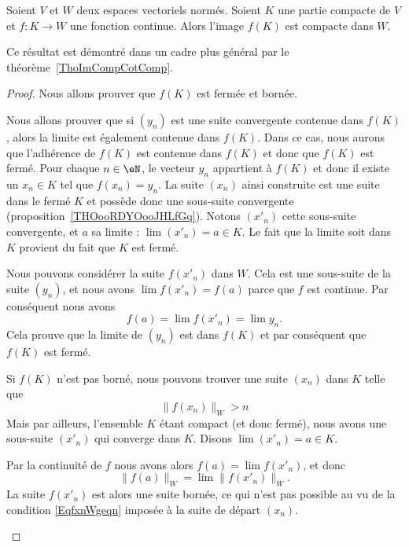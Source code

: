\begin{proposition}		\label{PropContinueCompactBorne}
	Soient \( V\) et \( W\) deux espaces vectoriels normés. Soient \( K\) une partie compacte de \( V\) et \( f\colon K\to W\) une fonction continue. Alors l'image \( f(K)\) est compacte dans \( W\).
\end{proposition}
Ce résultat est démontré dans un cadre plus général par le théorème~\ref{ThoImCompCotComp}.

\begin{proof}
	Nous allons prouver que \( f(K)\) est fermée et bornée.
	\begin{subproof}
		 Nous allons prouver que si \( (y_n)\) est une suite convergente contenue dans \( f(K)\), alors la limite est également contenue dans \( f(K)\). Dans ce cas, nous aurons que l'adhérence de \( f(K)\) est contenue dans \( f(K)\) et donc que \( f(K)\) est fermé. Pour chaque \( n\in\eN\), le vecteur \( y_n\) appartient à \( f(K)\) et donc il existe un \( x_n\in K\) tel que \( f(x_n)=y_n\). La suite \( (x_n)\) ainsi construite est une suite dans le fermé \( K\) et possède donc une sous-suite convergente (proposition~\ref{THOooRDYOooJHLfGq}). Notons \( (x'_n)\) cette sous-suite convergente, et \( a\) sa limite : \( \lim(x'_n)=a\in K\). Le fait que la limite soit dans \( K\) provient du fait que \( K\) est fermé.

        Nous pouvons considérer la suite \( f(x'_n)\) dans \( W\). Cela est une sous-suite de la suite \( (y_n)\), et nous avons \( \lim f(x'_n)=f(a)\) parce que \( f\) est continue. Par conséquent nous avons
		\begin{equation}
			f(a)=\lim f(x'_n)=\lim y_n.
		\end{equation}
		Cela prouve que la limite de \( (y_n)\) est dans \( f(K)\) et par conséquent que \( f(K)\) est fermé.

		Si \( f(K)\) n'est pas borné, nous pouvons trouver une suite \( (x_n)\) dans \( K\) telle que
		\begin{equation}		\label{EqfxnWgeqn}
			\| f(x_n) \|_W>n
		\end{equation}
		Mais par ailleurs, l'ensemble \( K\) étant compact (et donc fermé), nous avons une sous-suite \( (x'_n)\) qui converge dans \( K\). Disons \( \lim(x'_n)=a\in K\).

		Par la continuité de \( f\) nous avons alors \( f(a)=\lim f(x'_n)\), et donc
		\begin{equation}
			\| f(a) \|_W =\lim \| f(x'_n) \|_W.
		\end{equation}
		La suite \( f(x'_n)\) est alors une suite bornée, ce qui n'est pas possible au vu de la condition \eqref{EqfxnWgeqn} imposée à la suite de départ \( (x_n)\).
	\end{subproof}
\end{proof}

